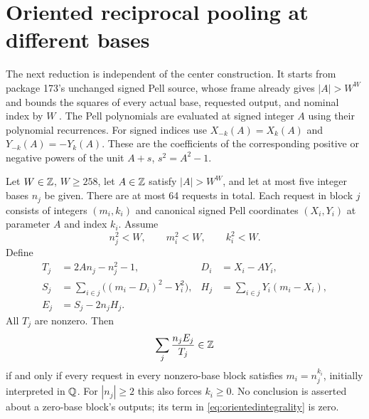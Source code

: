 \section{Oriented reciprocal pooling at different bases}

The next reduction is independent of the center construction. It
starts from package 173's unchanged signed Pell source, whose frame
already gives $|A|>W^W$ and bounds the squares of every actual base,
requested output, and nominal index by $W$ \cite{source173}.
The Pell polynomials are evaluated at signed integer $A$ using their
polynomial recurrences. For signed indices use $X_{-k}(A)=X_k(A)$ and
$Y_{-k}(A)=-Y_k(A)$. These are the coefficients of the corresponding
positive or negative powers of the unit $A+s$, $s^2=A^2-1$.

\begin{theorem}\label{thm:pool}
Let $W\in\mathbb Z$, $W\ge258$, let $A\in\mathbb Z$ satisfy $|A|>W^W$, and let at most five
integer bases $n_j$ be given. There are at most 64 requests in total.
Each request in block $j$ consists of integers $(m_i,k_i)$ and canonical
signed Pell coordinates $(X_i,Y_i)$ at parameter $A$ and index $k_i$.
Assume
\[
 n_j^2<W,\qquad m_i^2<W,\qquad k_i^2<W.
\]
Define
\begin{align*}
 T_j&=2An_j-n_j^2-1,&D_i&=X_i-AY_i,\\
 S_j&=\sum_{i\in j}\bigl((m_i-D_i)^2-Y_i^2\bigr),&
 H_j&=\sum_{i\in j}Y_i(m_i-X_i),\\
 E_j&=S_j-2n_jH_j.
\end{align*}
All $T_j$ are nonzero. Then
\begin{equation}\label{eq:orientedintegrality}
 \sum_j\frac{n_jE_j}{T_j}\in\mathbb Z
\end{equation}
if and only if every request in every nonzero-base block satisfies
$m_i=n_j^{k_i}$, initially interpreted in $\mathbb Q$. For $|n_j|\ge2$ this
also forces $k_i\ge0$. No conclusion is asserted about a zero-base
block's outputs; its term in \eqref{eq:orientedintegrality} is zero.
\end{theorem}

